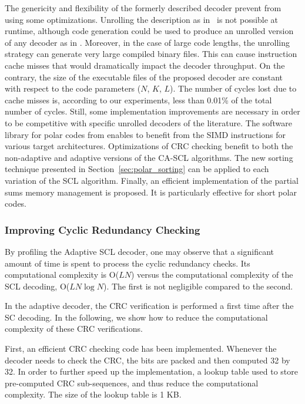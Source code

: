 The genericity and flexibility of the formerly described decoder prevent from
using some optimizations. Unrolling the description as in~\cite{Sarkis2016} is
not possible at runtime, although code generation could be used to produce an
unrolled version of any decoder as in \cite{Cassagne2015c}. Moreover, in the
case of large code lengths, the unrolling strategy can generate very large
compiled binary files. This can cause instruction cache misses that would
dramatically impact the decoder throughput. On the contrary, the size of the
executable files of the proposed decoder are constant with respect to the code
parameters ($N$, $K$, $L$). The number of cycles lost due to cache misses is,
according to our experiments, less than 0.01\% of the total number of cycles.
Still, some implementation improvements are necessary in order to be competitive
with specific unrolled decoders of the literature. The software library for
polar codes from \cite{Cassagne2015c,Cassagne2016b} enables to benefit from
the SIMD instructions for various target architectures. Optimizations of CRC
checking benefit to both the non-adaptive and adaptive versions of the CA-SCL
algorithms. The new sorting technique presented in
Section~\ref{sec:polar_sorting} can be applied to each variation of the SCL
algorithm. Finally, an efficient implementation of the partial sums memory
management is proposed. It is particularly effective for short polar codes.

\subsubsection{Improving Cyclic Redundancy Checking}
\label{sec:polar_crc}

By profiling the Adaptive SCL decoder, one may observe that a significant amount
of time is spent to process the cyclic redundancy checks. Its computational
complexity is O($LN$) versus the computational complexity of the SCL decoding,
O($LN\log N$). The first is not negligible compared to the second.

In the adaptive decoder, the CRC verification is performed a first time after
the SC decoding. In the following, we show how to reduce the computational
complexity of these CRC verifications.

First, an efficient CRC checking code has been implemented. Whenever the decoder
needs to check the CRC, the bits are packed and then computed 32 by 32. In order
to further speed up the implementation, a lookup table used to store
pre-computed CRC sub-sequences, and thus reduce the computational complexity.
The size of the lookup table is 1 KB.

